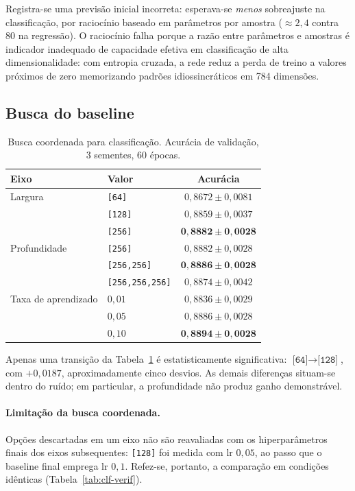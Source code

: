 \documentclass[11pt,a4paper]{article}
\begin{document}
Registra-se uma previsão inicial incorreta: esperava-se \emph{menos} sobreajuste na
classificação, por raciocínio baseado em parâmetros por amostra ($\approx 2{,}4$ contra
80 na regressão). O raciocínio falha porque a razão entre parâmetros e amostras é
indicador inadequado de capacidade efetiva em classificação de alta dimensionalidade:
com entropia cruzada, a rede reduz a perda de treino a valores próximos de zero
memorizando padrões idiossincráticos em 784 dimensões.

\subsection{Busca do baseline}

\begin{table}[htbp]
\centering
\caption{Busca coordenada para classificação. Acurácia de validação, 3 sementes, 60 épocas.}
\label{tab:clf-busca}
\begin{tabular}{llc}
\toprule
Eixo & Valor & Acurácia \\
\midrule
Largura & \texttt{[64]} & $0{,}8672 \pm 0{,}0081$ \\
        & \texttt{[128]} & $0{,}8859 \pm 0{,}0037$ \\
        & \texttt{[256]} & $\mathbf{0{,}8882 \pm 0{,}0028}$ \\
\midrule
Profundidade & \texttt{[256]} & $0{,}8882 \pm 0{,}0028$ \\
             & \texttt{[256,256]} & $\mathbf{0{,}8886 \pm 0{,}0028}$ \\
             & \texttt{[256,256,256]} & $0{,}8874 \pm 0{,}0042$ \\
\midrule
Taxa de aprendizado & $0{,}01$ & $0{,}8836 \pm 0{,}0029$ \\
                    & $0{,}05$ & $0{,}8886 \pm 0{,}0028$ \\
                    & $0{,}10$ & $\mathbf{0{,}8894 \pm 0{,}0028}$ \\
\bottomrule
\end{tabular}
\end{table}

Apenas uma transição da Tabela~\ref{tab:clf-busca} é estatisticamente significativa:
$\texttt{[64]} \to \texttt{[128]}$, com $+0{,}0187$, aproximadamente cinco desvios. As
demais diferenças situam-se dentro do ruído; em particular, a profundidade não produz
ganho demonstrável.

\paragraph{Limitação da busca coordenada.} Opções descartadas em um eixo não são
reavaliadas com os hiperparâmetros finais dos eixos subsequentes: \texttt{[128]} foi
medida com lr $0{,}05$, ao passo que o baseline final emprega lr $0{,}1$. Refez-se,
portanto, a comparação em condições idênticas (Tabela~\ref{tab:clf-verif}).
\end{document}
